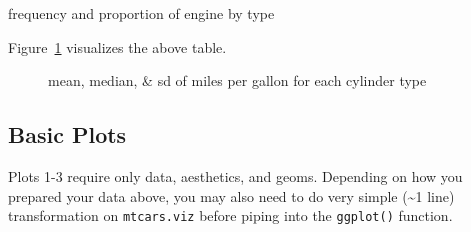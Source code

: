 \documentclass[
  man,
  floatsintext,
  longtable,
  nolmodern,
  notxfonts,
  notimes,
  colorlinks=true,linkcolor=blue,citecolor=blue,urlcolor=blue]{apa7}
\begin{document}
frequency and proportion of engine by type

Figure~\ref{fig-frequency-and-proportion-of-engine-being-v-shape-or-straight}
visualizes the above table.

\begin{figure}

\caption{\label{fig-frequency-and-proportion-of-engine-being-v-shape-or-straight}mean,
median, \& sd of miles per gallon for each cylinder type}


\end{figure}%

\subsection{Basic Plots}\label{basic-plots}

Plots 1-3 require only data, aesthetics, and geoms. Depending on how you
prepared your data above, you may also need to do very simple
(\textasciitilde1 line) transformation on \texttt{mtcars.viz} before
piping into the \texttt{ggplot()} function.
\end{document}
